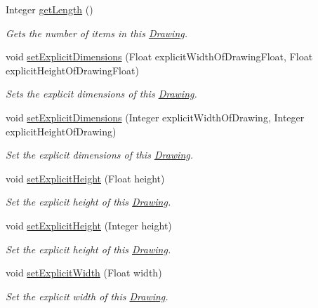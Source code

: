 \begin{DoxyCompactItemize}
Integer \hyperlink{classcom_1_1aarrelaakso_1_1drawl_1_1_drawing_a5959904c0c6e0046703141bb2327ef90}{get\+Length} ()
\begin{DoxyCompactList}\small\item\em Gets the number of items in this \hyperlink{classcom_1_1aarrelaakso_1_1drawl_1_1_drawing}{Drawing}. \end{DoxyCompactList}\item 
void \hyperlink{classcom_1_1aarrelaakso_1_1drawl_1_1_drawing_a1f6e1c7cc19b21dc114ce1fcaa4c0843}{set\+Explicit\+Dimensions} (Float explicit\+Width\+Of\+Drawing\+Float, Float explicit\+Height\+Of\+Drawing\+Float)
\begin{DoxyCompactList}\small\item\em Sets the explicit dimensions of this \hyperlink{classcom_1_1aarrelaakso_1_1drawl_1_1_drawing}{Drawing}. \end{DoxyCompactList}\item 
void \hyperlink{classcom_1_1aarrelaakso_1_1drawl_1_1_drawing_aaba87ad07d1574f91ea08f5022caf507}{set\+Explicit\+Dimensions} (Integer explicit\+Width\+Of\+Drawing, Integer explicit\+Height\+Of\+Drawing)
\begin{DoxyCompactList}\small\item\em Set the explicit dimensions of this \hyperlink{classcom_1_1aarrelaakso_1_1drawl_1_1_drawing}{Drawing}. \end{DoxyCompactList}\item 
void \hyperlink{classcom_1_1aarrelaakso_1_1drawl_1_1_drawing_a48a4a44d49cf54821b6cb50adad143c3}{set\+Explicit\+Height} (Float height)
\begin{DoxyCompactList}\small\item\em Set the explicit height of this \hyperlink{classcom_1_1aarrelaakso_1_1drawl_1_1_drawing}{Drawing}. \end{DoxyCompactList}\item 
void \hyperlink{classcom_1_1aarrelaakso_1_1drawl_1_1_drawing_a418641b3099d2070ee0fa69dc7b35af1}{set\+Explicit\+Height} (Integer height)
\begin{DoxyCompactList}\small\item\em Set the explicit height of this \hyperlink{classcom_1_1aarrelaakso_1_1drawl_1_1_drawing}{Drawing}. \end{DoxyCompactList}\item 
void \hyperlink{classcom_1_1aarrelaakso_1_1drawl_1_1_drawing_acac147e5eb6c93aaa44862c112ee7853}{set\+Explicit\+Width} (Float width)
\begin{DoxyCompactList}\small\item\em Set the explicit width of this \hyperlink{classcom_1_1aarrelaakso_1_1drawl_1_1_drawing}{Drawing}. \end{DoxyCompactList}\item 

\end{DoxyCompactItemize}
